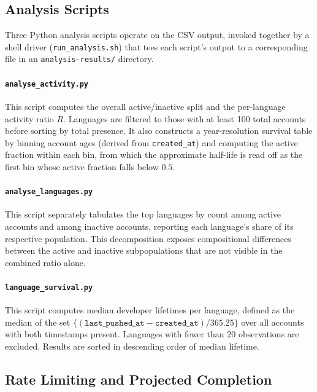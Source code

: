 \documentclass[12pt,a4paper]{article}
\begin{document}
\subsection{Analysis Scripts}

Three Python analysis scripts operate on the CSV output, invoked together by a
shell driver (\texttt{run\_analysis.sh}) that tees each script's output to a
corresponding file in an \texttt{analysis-results/} directory.

\paragraph{\texttt{analyse\_activity.py}} This script computes the overall
active/inactive split and the per-language activity ratio $R$. Languages are
filtered to those with at least 100 total accounts before sorting by total
presence. It also constructs a year-resolution survival table by binning account
ages (derived from \texttt{created\_at}) and computing the active fraction within
each bin, from which the approximate half-life is read off as the first bin whose
active fraction falls below $0.5$.

\paragraph{\texttt{analyse\_languages.py}} This script separately tabulates the
top languages by count among active accounts and among inactive accounts,
reporting each language's share of its respective population. This decomposition
exposes compositional differences between the active and inactive subpopulations
that are not visible in the combined ratio alone.

\paragraph{\texttt{language\_survival.py}} This script computes median developer
lifetimes per language, defined as the median of the set
$\{(\texttt{last\_pushed\_at} - \texttt{created\_at}) / 365.25\}$ over all
accounts with both timestamps present. Languages with fewer than 20 observations
are excluded. Results are sorted in descending order of median lifetime.

\subsection{Rate Limiting and Projected Completion}
\end{document}
